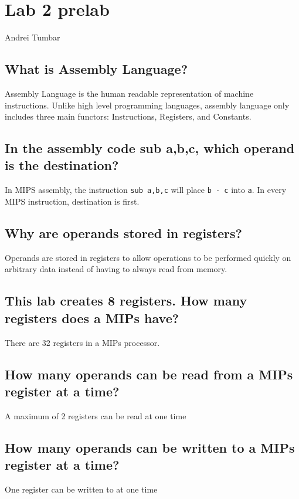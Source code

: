 \documentclass[11pt]{article}
\def\code#1{\texttt{#1}}
\begin{document}
    \section*{Lab 2 prelab}
    Andrei Tumbar

    \subsection*{What is Assembly Language?}
    Assembly Language is the human readable representation of machine instructions.
    Unlike high level programming languages, assembly language only includes three main functors:
    Instructions, Registers, and Constants.

    \subsection*{In the assembly code sub a,b,c, which operand is the destination?}
    In MIPS assembly, the instruction \code{sub a,b,c} will place \code{b - c} into \code{a}.
    In every MIPS instruction, destination is first.
    
    \subsection*{Why are operands stored in registers?}
    Operands are stored in registers to allow operations to be performed quickly on arbitrary data
    instead of having to always read from memory.

    \subsection*{This lab creates 8 registers. How many registers does a MIPs have?}
    There are 32 registers in a MIPs processor.
    
    \subsection*{How many operands can be read from a MIPs register at a time?}
    A maximum of 2 registers can be read at one time
    
    \subsection*{How many operands can be written to a MIPs register at a time?}
    One register can be written to at one time
\end{document}

